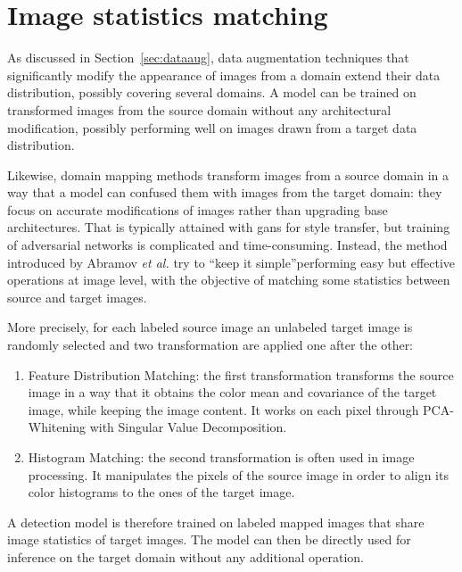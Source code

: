 \documentclass[%
    corpo=12pt,
    twoside,
    stile=classica,   
    tipotesi=magistrale,
    evenboxes,
    english,
	numerazioneromana,
]{toptesi}
\begin{document}
\section{Image statistics matching}
As discussed in Section~\ref{sec:dataaug}, data augmentation techniques that significantly modify the appearance of images from a domain extend their data distribution, possibly covering several domains. A model can be trained on transformed images from the source domain without any architectural modification, possibly performing well on images drawn from a target data distribution.

Likewise, domain mapping methods transform images from a source domain in a way that a model can confused them with images from the target domain: they focus on accurate modifications of images rather than upgrading base architectures. That is typically attained with \glspl{gan} for style transfer, but training of adversarial networks is complicated and time-consuming. Instead, the method introduced by Abramov \textit{et al.}\cite{abramov2020simple} try to \textquotedblleft keep it simple\textquotedblright performing easy but effective operations at image level, with the objective of matching some statistics between source and target images.

More precisely, for each labeled source image an unlabeled target image is randomly selected and two transformation are applied one after the other:
\begin{enumerate}
	\item Feature Distribution Matching: the first transformation transforms the source image in a way that it obtains the color mean and covariance of the target image, while keeping the image content. It works on each pixel through PCA-Whitening with Singular Value Decomposition.
	\item Histogram Matching: the second transformation is often used in image processing. It manipulates the pixels of the source image in order to align its color histograms to the ones of the target image.
\end{enumerate}
A detection model is therefore trained on labeled mapped images that share image statistics of target images. The model can then be directly used for inference on the target domain without any additional operation.
\end{document}
